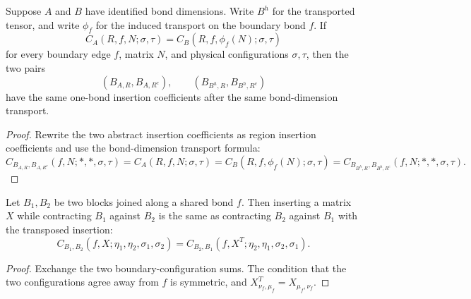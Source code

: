 \begin{theorem}%
    \label{thm:peps_sameTwoBlockInsertions_of_regionInsertedCoeff_eq}
    \leanok
    Suppose $A$ and $B$ have identified bond dimensions. Write $B^h$ for the
    transported tensor, and write $\phi_f$ for the induced transport on the
    boundary bond $f$. If
    \[
        C_A(R,f,N;\sigma,\tau)
        =
        C_B(R,f,\phi_f(N);\sigma,\tau)
    \]
    for every boundary edge $f$, matrix $N$, and physical configurations
    $\sigma,\tau$, then the two pairs
    \[
        (B_{A,R},B_{A,R^c}),\qquad
        (B_{B^h,R},B_{B^h,R^c})
    \]
    have the same one-bond insertion coefficients after the same
    bond-dimension transport.
\end{theorem}
\begin{proof}\leanok
    Rewrite the two abstract insertion coefficients as region insertion
    coefficients and use the bond-dimension transport formula:
    \[
        C_{B_{A,R},B_{A,R^c}}(f,N;*,*,\sigma,\tau)
        = C_A(R,f,N;\sigma,\tau)
        = C_B(R,f,\phi_f(N);\sigma,\tau)
        = C_{B_{B^h,R},B_{B^h,R^c}}(f,N;*,*,\sigma,\tau).
    \]
\end{proof}

\begin{theorem}
    \label{thm:peps_twoBlockInsertedCoeff_swap}
    \leanok
    Let \(B_1,B_2\) be two blocks joined along a shared bond \(f\).  Then inserting
    a matrix \(X\) while contracting \(B_1\) against \(B_2\) is the same as
    contracting \(B_2\) against \(B_1\) with the transposed insertion:
    \[
        C_{B_1,B_2}(f,X;\eta_1,\eta_2,\sigma_1,\sigma_2)
        =
        C_{B_2,B_1}(f,X^T;\eta_2,\eta_1,\sigma_2,\sigma_1).
    \]
\end{theorem}
\begin{proof}\leanok
    Exchange the two boundary-configuration sums.  The condition that the two
    configurations agree away from \(f\) is symmetric, and
    \(X^T_{\nu_f,\mu_f}=X_{\mu_f,\nu_f}\).
\end{proof}


